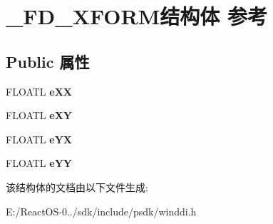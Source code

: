 \hypertarget{struct___f_d___x_f_o_r_m}{}\section{\+\_\+\+F\+D\+\_\+\+X\+F\+O\+R\+M结构体 参考}
\label{struct___f_d___x_f_o_r_m}
\subsection*{Public 属性}
\begin{DoxyCompactItemize}
\item 
\mbox{\label{struct___f_d___x_f_o_r_m_ab590aa270be5076929f07c2f033385de}} 
F\+L\+O\+A\+TL {\bfseries e\+XX}
\item 
\mbox{\label{struct___f_d___x_f_o_r_m_add7672f89b1bad9653e55e48662b2f39}} 
F\+L\+O\+A\+TL {\bfseries e\+XY}
\item 
\mbox{\label{struct___f_d___x_f_o_r_m_a458ef271bb503bd78209044958983088}} 
F\+L\+O\+A\+TL {\bfseries e\+YX}
\item 
\mbox{\label{struct___f_d___x_f_o_r_m_a6140307960cbbc5c5e62f40356421267}} 
F\+L\+O\+A\+TL {\bfseries e\+YY}
\end{DoxyCompactItemize}


该结构体的文档由以下文件生成\+:\begin{DoxyCompactItemize}
\item 
E\+:/\+React\+O\+S-\/0../sdk/include/psdk/winddi.\+h\end{DoxyCompactItemize}
